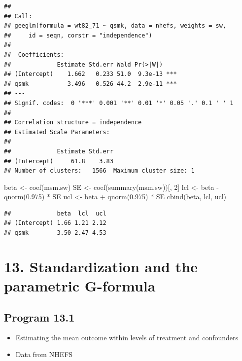 \documentclass[
  10pt,
]{book}
\newenvironment{Shaded}{\begin{snugshade}}{\end{snugshade}}
\newcommand{\DecValTok}[1]{\textcolor[rgb]{0.00,0.00,0.81}{#1}}
\newcommand{\FloatTok}[1]{\textcolor[rgb]{0.00,0.00,0.81}{#1}}
\newcommand{\FunctionTok}[1]{\textcolor[rgb]{0.00,0.00,0.00}{#1}}
\newcommand{\NormalTok}[1]{#1}
\newcommand{\OtherTok}[1]{\textcolor[rgb]{0.56,0.35,0.01}{#1}}
\newcommand{\SpecialCharTok}[1]{\textcolor[rgb]{0.00,0.00,0.00}{#1}}
\providecommand{\tightlist}{%
  \setlength{\itemsep}{0pt}\setlength{\parskip}{0pt}}
\begin{document}
\begin{verbatim}
## 
## Call:
## geeglm(formula = wt82_71 ~ qsmk, data = nhefs, weights = sw, 
##     id = seqn, corstr = "independence")
## 
##  Coefficients:
##             Estimate Std.err Wald Pr(>|W|)    
## (Intercept)    1.662   0.233 51.0  9.3e-13 ***
## qsmk           3.496   0.526 44.2  2.9e-11 ***
## ---
## Signif. codes:  0 '***' 0.001 '**' 0.01 '*' 0.05 '.' 0.1 ' ' 1
## 
## Correlation structure = independence 
## Estimated Scale Parameters:
## 
##             Estimate Std.err
## (Intercept)     61.8    3.83
## Number of clusters:   1566  Maximum cluster size: 1
\end{verbatim}

\begin{Shaded}
\begin{Highlighting}[]
\NormalTok{beta }\OtherTok{\textless{}{-}} \FunctionTok{coef}\NormalTok{(msm.sw)}
\NormalTok{SE }\OtherTok{\textless{}{-}} \FunctionTok{coef}\NormalTok{(}\FunctionTok{summary}\NormalTok{(msm.sw))[, }\DecValTok{2}\NormalTok{]}
\NormalTok{lcl }\OtherTok{\textless{}{-}}\NormalTok{ beta }\SpecialCharTok{{-}} \FunctionTok{qnorm}\NormalTok{(}\FloatTok{0.975}\NormalTok{) }\SpecialCharTok{*}\NormalTok{ SE}
\NormalTok{ucl }\OtherTok{\textless{}{-}}\NormalTok{ beta }\SpecialCharTok{+} \FunctionTok{qnorm}\NormalTok{(}\FloatTok{0.975}\NormalTok{) }\SpecialCharTok{*}\NormalTok{ SE}
\FunctionTok{cbind}\NormalTok{(beta, lcl, ucl)}
\end{Highlighting}
\end{Shaded}

\begin{verbatim}
##             beta  lcl  ucl
## (Intercept) 1.66 1.21 2.12
## qsmk        3.50 2.47 4.53
\end{verbatim}

\hypertarget{standardization-and-the-parametric-g-formula}{%
\chapter*{13. Standardization and the parametric G-formula}\label{standardization-and-the-parametric-g-formula}}

\hypertarget{program-13.1}{%
\section{Program 13.1}\label{program-13.1}}

\begin{itemize}
\tightlist
\item
  Estimating the mean outcome within levels of treatment and confounders
\item
  Data from NHEFS
\end{itemize}
\end{document}
